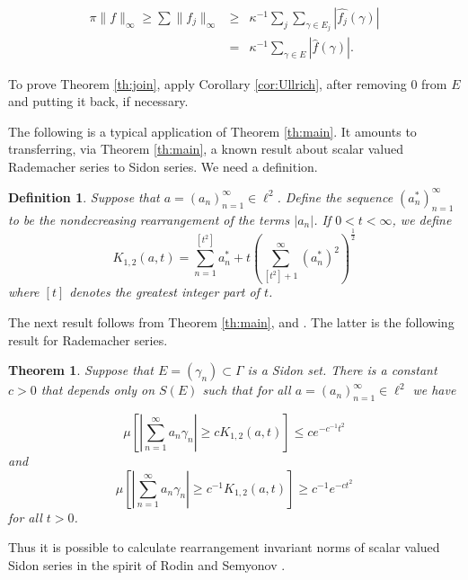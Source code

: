 \begin{eqnarray*}
\pi \|f\|_\infty \geq \sum\|f_j\|_\infty
                       & \geq & \kappa^{-1}\sum_{j}
                           \sum_{\gamma\in E_j}|\hat{f_j}(\gamma)| \\
                       & = & \kappa^{-1}
                           \sum_{\gamma\in E}|\hat{f}(\gamma)|.
\end{eqnarray*}


To prove Theorem \ref{th:join}, apply Corollary \ref{cor:Ullrich},
after removing 0 from $E$ and putting it back, if necessary.







The following is a typical application of Theorem \ref{th:main}.
It amounts to transferring, via Theorem \ref{th:main}, a known result
about scalar valued Rademacher series to Sidon series.  We need a definition.

\newtheorem{definition}[join]{Definition}
\begin{definition}
Suppose that $a =\left( a_n\right)_{n=1}^\infty \in \ell^2$.  Define the
sequence $\left( a_n^*\right)_{n=1}^\infty$ to be the nondecreasing
rearrangement of the terms $|a_n|$.  If $0<t<\infty$, we define
$$K_{1,2}(a,t)=\sum_{n=1}^{\left[ t^2\right] }a_n^*
+ t\left( \sum_{\left[ t^2\right] +1}^\infty
(a_n^*)^2\right)^{\frac{1}{2}}$$
where $\left[ t\right]$ denotes the greatest integer part of $t$.
\end{definition}

The next result follows from Theorem \ref{th:main}, and
\cite{bib:Mo1}.
  The latter is the following result for Rademacher series.

\newtheorem{th}[join]{Theorem}
\begin{th}
Suppose that $E=(\gamma_n)\subset\Gamma$ is a Sidon set.  There is a
constant $c>0$ that depends only on $S(E)$ such that for all
$a=(a_n)_{n=1}^\infty\in\ell^2$ we have

$$\mu\left[\left|\sum_{n=1}^\infty a_n\gamma_n\right|
                \geq cK_{1,2}(a,t)\right]
               \leq ce^{-c^{-1}t^2}$$
                 and
$$\mu\left[\left|\sum_{n=1}^\infty a_n\gamma_n\right|
                \geq c^{-1}K_{1,2}(a,t)\right]
                \geq c^{-1}e^{-ct^2}$$
for all $t>0$.
\end{th}

Thus it is possible to calculate rearrangement invariant norms of scalar
valued Sidon series in the spirit of Rodin and Semyonov \cite{bib:RS}.

